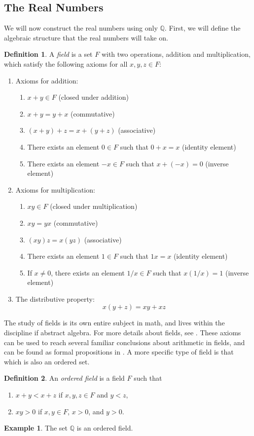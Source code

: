 \documentclass{article}
\newcommand{\Q}{\mathbb{Q}}
\theoremstyle{definition}
\newtheorem{definition}{Definition}[section]
\newtheorem{example}{Example}[section]
\begin{document}
	\subsection{The Real Numbers}
	We will now construct the real numbers using only $ \Q $. First, we will define the algebraic structure that the real numbers will take on.
	\begin{definition}\label{def1.11}
		A \textit{\color{red}field} is a set $ F $ with two operations, addition and multiplication, which satisfy the following axioms for all $ x,y,z\in F $:
		\begin{enumerate}
			\item Axioms for addition:
			\begin{enumerate}
				\item $ x+y\in F $ (closed under addition)
				\item $ x+y=y+x $ (commutative)
				\item $ (x+y)+z=x+(y+z) $ (associative)
				\item There exists an element $ 0\in F $ such that $ 0+x=x $ (identity element)
				\item There exists an element $ -x\in F $ such that $ x+(-x)=0 $ (inverse element)
			\end{enumerate}
			\item Axioms for multiplication:
			\begin{enumerate}
				\item $ xy\in F $ (closed under multiplication)
				\item $ xy=yx $ (commutative)
				\item $ (xy)z=x(yz) $ (associative)
				\item There exists an element $ 1\in F $ such that $ 1x=x $ (identity element)
				\item If $ x\neq 0 $, there exists an element $ 1/x\in F $ such that $ x(1/x)=1 $ (inverse element)
			\end{enumerate}
			\item The distributive property:
			$$ x(y+z)=xy+xz$$
		\end{enumerate}
	\end{definition}
	The study of fields is its own entire subject in math, and lives within the discipline if abstract algebra. For more details about fields, see \cite{dummit2004abstract}. These axioms can be used to reach several familiar conclusions about arithmetic in fields, and can be found as formal propositions in \cite{rudin1964principles}. A more specific type of field is that which is also an ordered set.
	\begin{definition}\label{def1.12}
		An \textit{\color{red} ordered field} is a field $ F $ such that
		\begin{enumerate}
			\item $ x+y<x+z $ if $ x,y,z\in F $ and $ y<z $,
			\item $ xy>0 $ if $ x,y\in F $, $ x>0 $, and $ y>0 $. 
		\end{enumerate}
	\end{definition}
	\begin{example}
		The set $ \Q $ is an ordered field. 
	\end{example}
	
\end{document}
